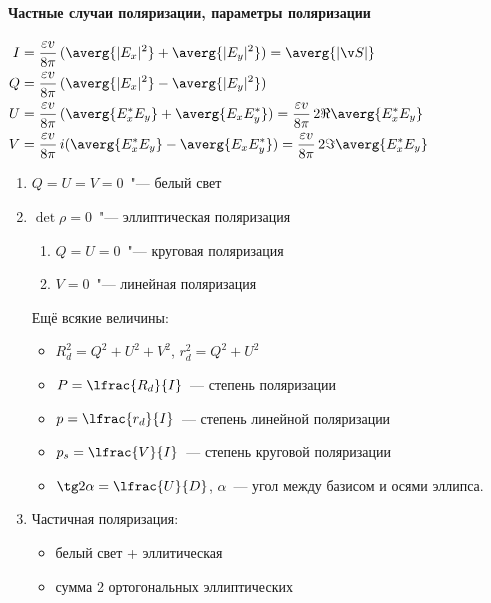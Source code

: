\documentclass{trchesh}
\begin{document}
\begin{multicols*}{3}
\paragraph{Частные случаи поляризации, параметры поляризации}
$
\begin{aligned}
  I &= \frac{\varepsilon v}{8 \pi} \, (\averg{|E_x|^2} +  \averg{|E_y|^2}) = \averg{|\v S|} \\
  Q &= \frac{\varepsilon v}{8 \pi} \, (\averg{|E_x|^2} -  \averg{|E_y|^2}) \\
  U &= \frac{\varepsilon v}{8 \pi} \, (\averg{E_x^* E_y} +  \averg{E_x E_y^*}) 
  = \frac{\varepsilon v}{8 \pi} \, 2 \Re \averg{E_x^* E_y} \\
  V &= \frac{\varepsilon v}{8 \pi} \,i (\averg{E_x^* E_y} -  \averg{E_x E_y^*}) 
  = \frac{\varepsilon v}{8 \pi} \, 2 \Im \averg{E_x^* E_y} \\
\end{aligned}
$
\begin{enumerate}
  \item $Q=U=V=0$~"--- белый свет
  \item $\det \rho = 0$~"--- эллиптическая поляризация
\begin{enumerate}
  \item $Q=U=0$~"--- круговая поляризация
  \item $V=0$~"--- линейная поляризация
\end{enumerate}

Ещё всякие величины:
\begin{itemize}
  \item $R_d^2 = Q^2 + U^2 + V^2$, $r_d^2 = Q^2 + U^2$
  \item $P = \lfrac{R_d}{I}$~--- степень поляризации
  \item $p = \lfrac{r_d}{I}$~--- степень линейной поляризации
  \item $p_s = \lfrac{V}{I}$~--- степень круговой поляризации
  \item $\tg 2 \alpha = \lfrac{U}{D}$, $\alpha$~--- угол между базисом и осями эллипса.
\end{itemize}

\item Частичная поляризация:  
\begin{itemize}
  \item белый свет + эллитическая
  \item сумма 2 ортогональных эллиптических
\end{itemize}
\end{enumerate}

\end{multicols*}
\end{document}
